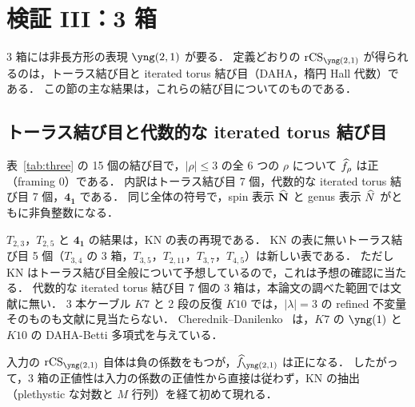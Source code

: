 \section{検証 III：3 箱}\label{sec:three}

3 箱には非長方形の表現 $\yng(2,1)$ が要る．
定義どおりの $\rCS_{\yng(2,1)}$ が得られるのは，トーラス結び目と iterated torus 結び目（DAHA，楕円 Hall 代数）である．
この節の主な結果は，これらの結び目についてのものである．

\subsection{トーラス結び目と代数的な iterated torus 結び目}
\begin{compresult}\label{cr:three}
表~\ref{tab:three} の 15 個の結び目で，$|\rho|\le3$ の全 6 つの $\rho$ について $\widehat{f}_\rho$ は正（framing 0）である．
内訳はトーラス結び目 7 個，代数的な iterated torus 結び目 7 個，$\mathbf{4_1}$ である．
同じ全体の符号で，spin 表示 $\widehat{\mathbf{N}}$ と genus 表示 $\widehat{N}$ がともに非負整数になる．
\end{compresult}

\begin{table}[h]
\centering
\caption[3 箱までの判定（framing 0）]{3 箱までの判定（framing 0）．$\checkmark(n)$ は spin 表示と genus 表示の両方で負の項が 0 で，$n$ は spin 表示の項数．
$T_{2,3}$，$T_{2,5}$ と $\mathbf{4_1}$ は KN の表の再現である．$\mathbf{4_1}$ の $\yng(2,1)$ は KN の候補を用いた．}\label{tab:three}
\resizebox{\textwidth}{!}{}
\end{table}

$T_{2,3}$，$T_{2,5}$ と $\mathbf{4_1}$ の結果は，KN の表の再現である．
KN の表に無いトーラス結び目 5 個（$T_{3,4}$ の 3 箱，$T_{3,5}$，$T_{2,11}$，$T_{3,7}$，$T_{4,5}$）は新しい表である．
ただし KN はトーラス結び目全般について予想しているので，これは予想の確認に当たる．
代数的な iterated torus 結び目 7 個の 3 箱は，本論文の調べた範囲では文献に無い．
3 本ケーブル $K7$ と 2 段の反復 $K10$ では，$|\lambda|=3$ の refined 不変量そのものも文献に見当たらない．
Cherednik--Danilenko~\cite{Cherednik14} は，$K7$ の $\yng(1)$ と $K10$ の DAHA-Betti 多項式を与えている．

\begin{remark}
入力の $\rCS_{\yng(2,1)}$ 自体は負の係数をもつが，$\hf_{\yng(2,1)}$ は正になる．
したがって，3 箱の正値性は入力の係数の正値性から直接は従わず，KN の抽出（plethystic な対数と $M$ 行列）を経て初めて現れる．
\end{remark}

